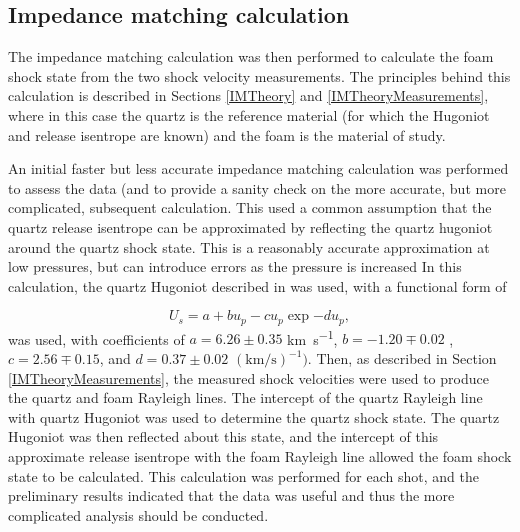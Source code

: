

\subsection{Impedance matching calculation} \label{IM calc}
The impedance matching calculation was then performed to calculate the foam shock state from the two shock velocity measurements. The principles behind this calculation is described in Sections \ref{IMTheory} and \ref{IMTheoryMeasurements}, where in this case the quartz is the reference material (for which the Hugoniot and release isentrope are known) and the foam is the material of study.

An initial faster but less accurate impedance matching calculation was performed to assess the data (and to provide a sanity check on the more accurate, but more complicated, subsequent calculation. This used a common assumption that the quartz release isentrope can be approximated by reflecting the quartz hugoniot around the quartz shock state. This is a reasonably accurate approximation at low pressures, but can introduce errors as the pressure is increased \cite{Forbes2012.} In this calculation, the quartz Hugoniot described in \cite{Knudson2009} was used, with a functional form of 

\begin{equation} \label{eqn:Old Hugoniot} U_s = a + b u_p - c u_p \exp{-d u_p}, \end{equation}
was used, with coefficients of $a = 6.26 \pm 0.35$ \unit{\kilo\meter\per\second}, $b = -1.20 \mp 0.02$ , $c = 2.56 \mp 0.15$, and $d = 0.37 \pm 0.02$ $(\unit{\kilo\meter\per\second})^{-1})$. Then, as described in Section \ref{IMTheoryMeasurements}, the measured shock velocities were used to produce the quartz and foam Rayleigh lines. The intercept of the quartz Rayleigh line with quartz Hugoniot was used to determine the quartz shock state. The quartz Hugoniot was then reflected about this state, and the intercept of this approximate release isentrope with the foam Rayleigh line allowed the foam shock state to be calculated. This calculation was performed for each shot, and the preliminary results indicated that the data was useful and thus the more complicated analysis should be conducted.

